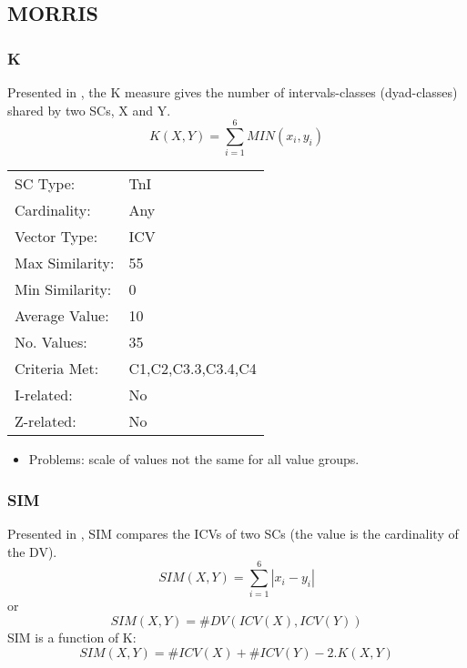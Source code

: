 \documentclass{article}
\begin{document}
\subsection{MORRIS}
\label{sec-11-1}
\subsubsection{K}
\label{sec-11-1-1}

Presented in \citet[pp. 448]{Morris1979}, the K measure gives the
number of intervals-classes (dyad-classes) shared by two SCs, X and Y.
$$ K(X,Y)= \sum_{i=1}^{6}{MIN(x_{i},y_{i})} $$

\begin{center}
\begin{tabular}{ll}
 SC Type:         &  TnI                 \\
 Cardinality:     &  Any                 \\
 Vector Type:     &  ICV                 \\
 Max Similarity:  &  55                  \\
 Min Similarity:  &  0                   \\
 Average Value:   &  10                  \\
 No. Values:      &  35                  \\
 Criteria Met:    &  C1,C2,C3.3,C3.4,C4  \\
 I-related:       &  No                  \\
 Z-related:       &  No                  \\
\end{tabular}
\end{center}


\begin{itemize}
\item Problems: scale of values not the same for all value groups.
\end{itemize}
\subsubsection{SIM}
\label{sec-11-1-2}

Presented in \citet[pp. 446]{Morris1979}, SIM compares the ICVs of
two SCs (the value is the cardinality of the DV).
$$SIM\left(X,Y\right)=\sum_{i=1}^{6}\left|x_{i}-y_{i}\right|$$
or
$$SIM\left(X,Y\right)=\#DV\left(ICV\left(X\right),ICV\left(Y\right)\right)$$
SIM is a function of K:
$$SIM(X,Y) = \#ICV(X) + \#ICV(Y) - 2.K(X,Y)$$
\end{document}
